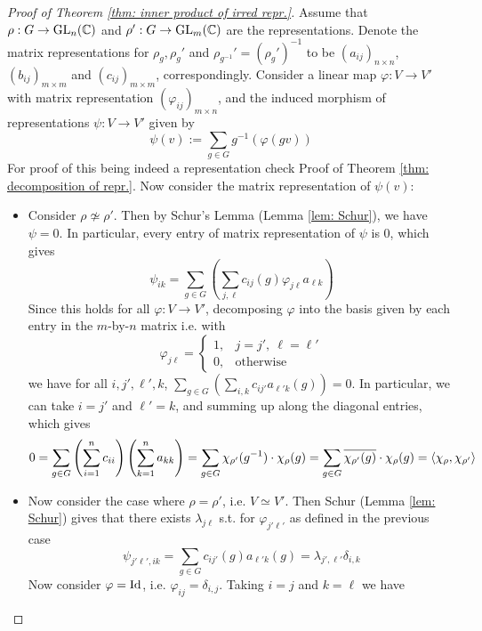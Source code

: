 \begin{proof}[Proof of Theorem \ref{thm: inner product of irred repr.}]
    Assume that $\rho: G \to \mathrm{GL}_n(\mathbb{C})$ and $\rho': G \to \mathrm{GL}_m(\mathbb{C})$ are the representations. Denote the matrix representations for $\rho_g, \rho_{g}'$ and $\rho_{g^{-1}}' = (\rho_{g}')^{-1}$ to be $(a_{ij})_{n \times n}$, $(b_{ij})_{m \times m}$ and $(c_{ij})_{m \times m}$, correspondingly. Consider a linear map $\varphi: V \to V'$ with matrix representation $(\varphi_{ij})_{m \times n}$, and the induced morphism of representations $\psi: V \to V'$ given by
    \[
        \psi(v) := \sum_{g \in G} g^{-1}(\varphi(gv))
    \]
    For proof of this being indeed a representation check Proof of Theorem \ref{thm: decomposition of repr.}. Now consider the matrix representation of $\psi(v)$:
    \begin{itemize}
        \item Consider $\rho \nsimeq \rho'$. Then by Schur's Lemma (Lemma \ref{lem: Schur}), we have $\psi = 0$. In particular, every entry of matrix representation of $\psi$ is 0, which gives
        \[
            \psi_{ik} = \sum_{g \in G} \left( \sum_{j, \ell} c_{ij}(g) \varphi_{j \ell} a_{\ell k} \right)
        \]
        Since this holds for all $\varphi: V \to V'$, decomposing $\varphi$ into the basis given by each entry in the $m$-by-$n$ matrix i.e. with
        \[
            \varphi_{j\ell} = 
            \begin{cases}
                1, & j = j',\ \ell = \ell' \\
                0, & \text{otherwise}
            \end{cases}
        \]
        we have for all $i, j', \ell', k$, $\sum_{g \in G} (\sum_{i, k} c_{i j'} a_{\ell' k}(g)) = 0$. In particular, we can take $i = j'$ and $\ell' = k$, and summing up along the diagonal entries, which gives
        \[
            0 = \sum_{g \in G} \left( \sum_{i = 1}^n c_{ii} \right) \left( \sum_{k = 1}^n a_{kk} \right)
            = \sum_{g \in G} \chi_{\rho'}(g^{-1}) \cdot \chi_{\rho} (g) = \sum_{g \in G} \overline{\chi_{\rho'}(g)} \cdot \chi_{\rho} (g) = \left\langle \chi_{\rho}, \chi_{\rho'} \right\rangle
        \]
        \item Now consider the case where $\rho = \rho'$, i.e. $V \simeq V'$. Then Schur (Lemma \ref{lem: Schur}) gives that there exists $\lambda_{j \ell}$ s.t. for $\varphi_{j'\ell'}$ as defined in the previous case
        \[
            \psi_{j'\ell', ik} = \sum_{g \in G} c_{ij'}(g) a_{\ell' k}(g) = \lambda_{j', \ell'} \delta_{i, k}
        \]
        Now consider $\varphi = \mathrm{Id}$, i.e. $\varphi_{ij} = \delta_{i, j}$. Taking $i = j$ and $k = \ell$ we have

\end{itemize}
\end{proof}
